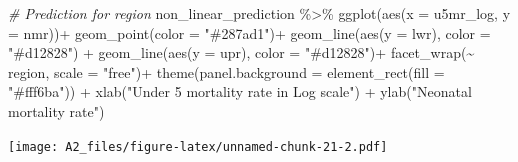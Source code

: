 \documentclass[
]{article}
\newenvironment{Shaded}{\begin{snugshade}}{\end{snugshade}}
\newcommand{\AttributeTok}[1]{\textcolor[rgb]{0.77,0.63,0.00}{#1}}
\newcommand{\CommentTok}[1]{\textcolor[rgb]{0.56,0.35,0.01}{\textit{#1}}}
\newcommand{\FunctionTok}[1]{\textcolor[rgb]{0.00,0.00,0.00}{#1}}
\newcommand{\NormalTok}[1]{#1}
\newcommand{\SpecialCharTok}[1]{\textcolor[rgb]{0.00,0.00,0.00}{#1}}
\newcommand{\StringTok}[1]{\textcolor[rgb]{0.31,0.60,0.02}{#1}}
\begin{document}
\begin{Shaded}
\begin{Highlighting}[]
\CommentTok{\#  Prediction for region}
\NormalTok{non\_linear\_prediction }\SpecialCharTok{\%\textgreater{}\%}
  \FunctionTok{ggplot}\NormalTok{(}\FunctionTok{aes}\NormalTok{(}\AttributeTok{x =}\NormalTok{ u5mr\_log, }\AttributeTok{y =}\NormalTok{ nmr))}\SpecialCharTok{+}
  \FunctionTok{geom\_point}\NormalTok{(}\AttributeTok{color =} \StringTok{"\#287ad1"}\NormalTok{)}\SpecialCharTok{+}
  \FunctionTok{geom\_line}\NormalTok{(}\FunctionTok{aes}\NormalTok{(}\AttributeTok{y =}\NormalTok{ lwr), }\AttributeTok{color =} \StringTok{"\#d12828"}\NormalTok{) }\SpecialCharTok{+}
  \FunctionTok{geom\_line}\NormalTok{(}\FunctionTok{aes}\NormalTok{(}\AttributeTok{y =}\NormalTok{ upr), }\AttributeTok{color =} \StringTok{"\#d12828"}\NormalTok{)}\SpecialCharTok{+}
  \FunctionTok{facet\_wrap}\NormalTok{(}\SpecialCharTok{\textasciitilde{}}\NormalTok{ region, }\AttributeTok{scale =} \StringTok{"free"}\NormalTok{)}\SpecialCharTok{+}
  \FunctionTok{theme}\NormalTok{(}\AttributeTok{panel.background =} \FunctionTok{element\_rect}\NormalTok{(}\AttributeTok{fill =} \StringTok{"\#fff6ba"}\NormalTok{)) }\SpecialCharTok{+}
  \FunctionTok{xlab}\NormalTok{(}\StringTok{"Under 5 mortality rate in Log scale"}\NormalTok{) }\SpecialCharTok{+}
  \FunctionTok{ylab}\NormalTok{(}\StringTok{"Neonatal mortality rate"}\NormalTok{)}
\end{Highlighting}
\end{Shaded}

\texttt{[image: A2\_files/figure-latex/unnamed-chunk-21-2.pdf]}
\end{document}
